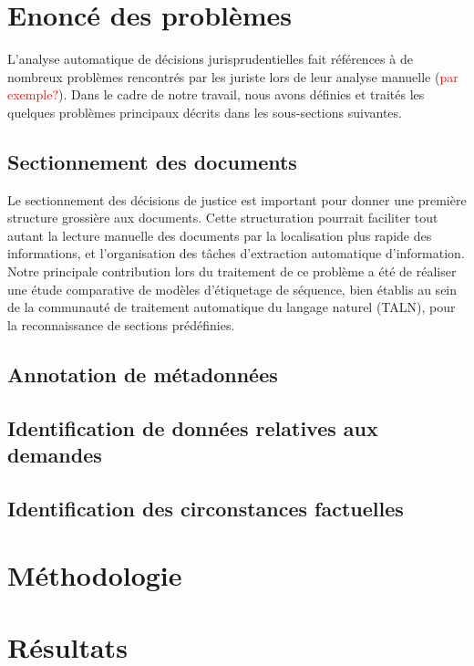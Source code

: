 \section{Enoncé des problèmes}
\label{sec:intro:probleme}
L'analyse automatique de décisions jurisprudentielles fait références à de nombreux problèmes rencontrés par les juriste lors de leur analyse manuelle (\textcolor{red}{par exemple?}). Dans le cadre de notre travail, nous avons définies et traités les quelques problèmes principaux décrits dans les sous-sections suivantes.
\subsection{Sectionnement des documents}
Le sectionnement des décisions de justice est important pour donner une première structure grossière aux documents. Cette structuration pourrait faciliter tout autant la lecture manuelle des documents par la localisation plus rapide des informations, et l'organisation des tâches d'extraction automatique d'information. Notre principale contribution lors du traitement de ce problème a été de réaliser une étude comparative de modèles d'étiquetage de séquence, bien établis au sein de la communauté de traitement automatique du langage naturel (TALN),  pour la reconnaissance de sections prédéfinies. 

\subsection{Annotation de métadonnées}

\subsection{Identification de données relatives aux demandes}

\subsection{Identification des circonstances factuelles}

\section{Méthodologie}
\label{sec:intro:methodologie}


\section{Résultats}
\label{sec:intro:résultats}

